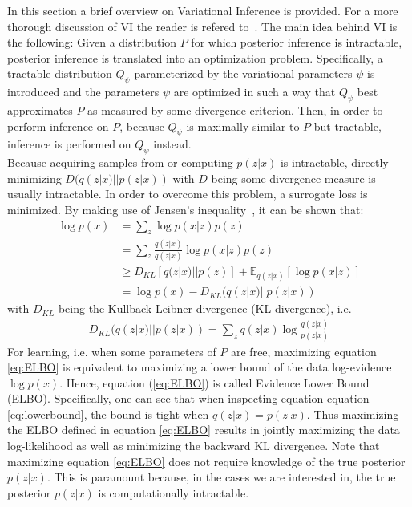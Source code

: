 \documentclass[11pt]{cmuthesis} %
\begin{document}
In this section a brief overview on Variational Inference is provided. For a more thorough discussion of VI the reader is refered to~\cite{blei2017variational,zhang2017advances}. The main idea behind VI is the following: Given a distribution $P$ for which posterior inference is intractable, posterior inference is translated into an optimization problem. Specifically, a tractable distribution $Q_\psi$ parameterized by the variational parameters $\psi$ is introduced and the parameters $\psi$ are optimized in such a way that $Q_\psi$ best approximates $P$ as measured by some divergence criterion. Then, in order to perform inference on $P$, because $Q_\psi$ is maximally similar to $P$ but tractable, inference is performed on $Q_\psi$ instead.\\
Because acquiring samples from or computing $p(z|x)$ is intractable, directly minimizing $D(q(z|x)||p(z|x))$ with $D$ being some divergence measure is usually intractable. In order to overcome this problem, a surrogate loss is minimized. By making use of Jensen's inequality~\cite{kuczma2009introduction}, it can be shown that:
\begin{align}
\log p(x) &= \sum_z \log p(x|z) p(z)\\
              &= \sum_z \frac{q(z|x)}{q(z|x)} \log p(x|z) p(z)\\
              &\geq D_{KL} [q(z|x) || p(z)] + \mathbb{E}_{q(z|x)} [\log p(x|z)]\label{eq:ELBO}\\
              & = \log p(x) - D_{KL}(q(z|x) || p(z|x)) \label{eq:lowerbound}
\end{align}
with $D_{KL}$ being the Kullback-Leibner divergence (KL-divergence), i.e.
\begin{align*}
D_{KL}(q(z|x) || p(z|x)) = \sum_z q(z|x) \log \frac{q(z|x)}{p(z|x)}
\end{align*}
For learning, i.e. when some parameters of $P$ are free, maximizing equation \ref{eq:ELBO} is equivalent to maximizing a lower bound of the data log-evidence $\log p(x)$. Hence, equation (\ref{eq:ELBO}) is called Evidence Lower Bound (ELBO). Specifically, one can see that when inspecting equation equation \ref{eq:lowerbound}, the bound is tight when $q(z|x) = p(z|x)$. Thus maximizing the ELBO defined in equation \ref{eq:ELBO} results in jointly maximizing the data log-likelihood as well as minimizing the backward KL divergence. Note that maximizing equation \ref{eq:ELBO} does not require knowledge of the true posterior $p(z|x)$. This is paramount because, in the cases we are interested in, the true posterior $p(z|x)$ is computationally intractable.
\end{document}
